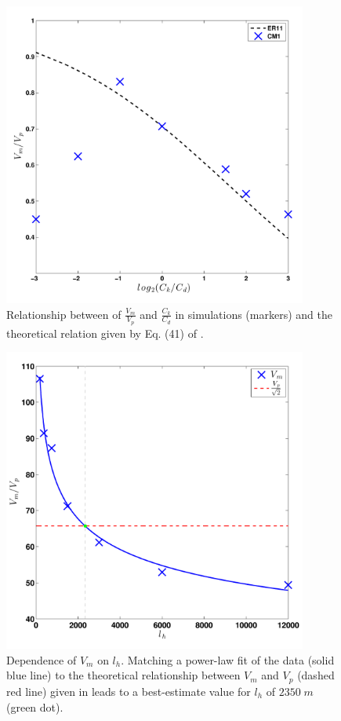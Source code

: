 \documentclass[12pt]{article}
\begin{document}
\begin{figure}[h!]
\centering
  \noindent\includegraphics[width=10cm,height=10cm]{FIGURES_TC_RCE_equilibrium_v2.0/Fig9_CkCd_scaling_VmVp.pdf}
\caption{Relationship between of $\frac{V_m}{V_p}$ and $\frac{C_k}{C_d}$ in simulations (markers) and the theoretical relation given by Eq. (41) of \cite{Emanuel_Rotunno_2011}.}
\label{fig:VmVp_CkCd}
\end{figure}


\begin{figure}[h!]
\centering
  \noindent\includegraphics[width=10cm,height=10cm]{FIGURES_TC_RCE_equilibrium_v2.0/Fig10_lh_optimize.pdf}
\caption{Dependence of $V_m$ on $l_h$. Matching a power-law fit of the data (solid blue line) to the theoretical relationship between $V_m$ and $V_p$ (dashed red line) given in \cite{Emanuel_Rotunno_2011} leads to a best-estimate value for $l_h$ of $2350 \; m$ (green dot).}
\label{fig:lh_optimize}
\end{figure}
\end{document}
